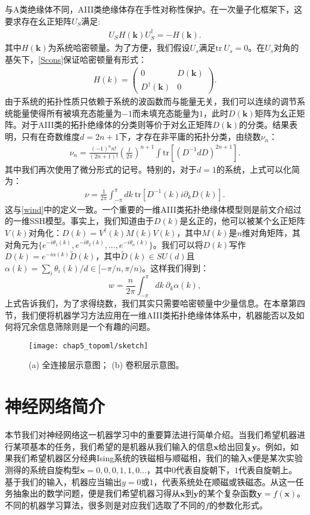 与A类绝缘体不同，AIII类绝缘体存在手性对称性保护。在一次量子化框架下，这要求存在幺正矩阵$U_S$满足:
\begin{align}
U_SH(\mathbf{k})U_S^\dagger=-H(\mathbf{k}).\label{Scons}
\end{align}
其中$H(\mathbf{k})$为系统哈密顿量。为了方便，我们假设$U_s$满足$\text{tr}\ U_s=0$。在$U_s$对角的基矢下，\eqref{Scons}保证哈密顿量有形式：
\begin{align}\label{eq:D(k)}
    H(k)=\begin{pmatrix} 0 & D(\mathbf{k}) \\ D^{\dagger}(\mathbf{k}) & 0 \end{pmatrix}.
\end{align}
由于系统的拓扑性质只依赖于系统的波函数而与能量无关，我们可以连续的调节系统能量使得所有被填充态能量为$-1$而未填充态能量为$1$，此时$D(\mathbf{k})$矩阵为幺正矩阵。对于AIII类的拓扑绝缘体的分类则等价于对幺正矩阵$D(\mathbf{k})$的分类。结果表明，只有在奇数维度$d=2n+1$下，才存在非平庸的拓扑分类，由绕数$\nu_{n}$：
\begin{align}
\nu_{n}=\frac{(-1)^n n!}{(2n+1)!}\left(\frac{\ii}{2\pi}\right)^{n+1}\int \text{tr} \left[(D^{-1}dD)^{2n+1}\right].
\end{align}
其中我们再次使用了微分形式的记号。特别的，对于$d=1$的系统，上式可以化简为：
\begin{align}
\nu=\frac{1}{2\pi}\int_{-\pi}^{\pi}dk\ \mathrm{tr}[D^{-1}(k)i\partial_kD(k)].
\end{align}
这与\eqref{wind}中的定义一致。一个重要的一维AIII类拓扑绝缘体模型则是前文介绍过的一维SSH模型。事实上，我们知道由于$D(k)$是幺正的，他可以被某个幺正矩阵$V(k)$对角化：$D(k)=V^{\dagger}(k)M(k)V(k)$，其中$M(k)$是$n$维对角矩阵，其对角元为$\{e^{-i\theta_1(k)}, e^{-i\theta_2(k)},...,e^{-i\theta_n(k)}\}$。我们可以将$D(k)$写作$D(k)=e^{-i\alpha(k)}\tilde{D}(k)$，其中$\tilde{D}(k)\in SU(d)$且$\alpha(k)=\sum_i\theta_i(k)/d\in [-\pi/n,\pi/n)$。这样我们得到：
\begin{equation}
    w=\dfrac{n}{2\pi}\int_{-\pi}^{\pi}dk\ \partial_k\alpha(k),
\end{equation}
上式告诉我们，为了求得绕数，我们其实只需要哈密顿量中少量信息。在本章第四节，我们便将机器学习方法应用在一维AIII类拓扑绝缘体体系中，机器能否以及如何将冗余信息筛除则是一个有趣的问题。
\begin{figure}[t]
\centering
\texttt{[image: chap5\_topoml/sketch]}
\caption{
(a) 全连接层示意图；
(b) 卷积层示意图。}
\label{fig:sketch}
\end{figure}
\section{神经网络简介}
本节我们对神经网络这一机器学习中的重要算法进行简单介绍。当我们希望机器进行某项基本的任务，我们希望的是机器从我们输入的信息$\mathbf{x}$给出回复$\mathbf{y}$。例如，如果我们希望机器区分经典Ising系统的铁磁相与顺磁相，我们的输入$\mathbf{x}$便是某次实验测得的系统自旋构型$\mathbf{x}={0,0,0,1,1,0...}$，其中$0$代表自旋朝下，$1$代表自旋朝上。基于我们的输入，机器应当输出$y=0$或$1$，代表系统处在顺磁或铁磁态。从这一任务抽象出的数学问题，便是我们希望机器习得从$\mathbf{x}$到$\mathbf{y}$的某个复杂函数$\mathbf{y}=f(\mathbf{x})$。不同的机器学习算法，很多则是对应我们选取了不同的$f$的参数化形式。

